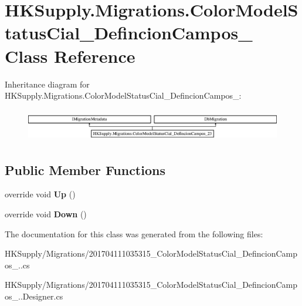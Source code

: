 \hypertarget{class_h_k_supply_1_1_migrations_1_1_color_model_status_cial___defincion_campos__23}{}\section{H\+K\+Supply.\+Migrations.\+Color\+Model\+Status\+Cial\+\_\+\+Defincion\+Campos\+\_ Class Reference}
\label{class_h_k_supply_1_1_migrations_1_1_color_model_status_cial___defincion_campos__23}
Inheritance diagram for H\+K\+Supply.\+Migrations.\+Color\+Model\+Status\+Cial\+\_\+\+Defincion\+Campos\+\_\+:\begin{figure}[H]
\begin{center}
\leavevmode
\includegraphics[height=1.428571cm]{class_h_k_supply_1_1_migrations_1_1_color_model_status_cial___defincion_campos__23}
\end{center}
\end{figure}
\subsection*{Public Member Functions}
\begin{DoxyCompactItemize}
\item 
\mbox{\label{class_h_k_supply_1_1_migrations_1_1_color_model_status_cial___defincion_campos__23_aad727cc0b1f6786c935125b5e8d7e3d7}} 
override void {\bfseries Up} ()
\item 
\mbox{\label{class_h_k_supply_1_1_migrations_1_1_color_model_status_cial___defincion_campos__23_a5d22cbb20b30c90c0f7288232181d2e1}} 
override void {\bfseries Down} ()
\end{DoxyCompactItemize}


The documentation for this class was generated from the following files\+:\begin{DoxyCompactItemize}
\item 
H\+K\+Supply/\+Migrations/201704111035315\+\_\+\+Color\+Model\+Status\+Cial\+\_\+\+Defincion\+Campos\+\_..\+cs\item 
H\+K\+Supply/\+Migrations/201704111035315\+\_\+\+Color\+Model\+Status\+Cial\+\_\+\+Defincion\+Campos\+\_..\+Designer.\+cs\end{DoxyCompactItemize}
